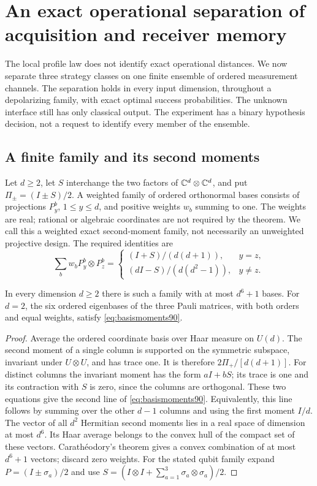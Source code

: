 \section{An exact operational separation of acquisition and receiver memory}
\label{sec:operationalmemory90}
The local profile law does not identify exact operational distances.
We now separate three strategy classes on one finite ensemble of ordered
measurement channels.  The separation holds in every input dimension,
throughout a depolarizing family, with exact optimal success probabilities.
The unknown interface still has only classical output.  The experiment
has a binary hypothesis decision, not a request to identify every member
of the ensemble.

\subsection{A finite family and its second moments}
Let $d\ge2$, let $S$ interchange the two factors of $\mathbb C^d\otimes\mathbb C^d$,
and put $\Pi_\pm=(I\pm S)/2$.  A weighted family of ordered orthonormal
bases consists of projections $P_y^b$, $1\le y\le d$, and positive
weights $w_b$ summing to one.  The weights are real; rational or algebraic coordinates are not required
by the theorem.  We call this a weighted exact second-moment family,
not necessarily an unweighted projective design.  The required identities are
\begin{equation}\label{eq:basismoments90}
 \sum_b w_b P_y^b\otimes P_z^b=
 \begin{cases}
 (I+S)/(d(d+1)),&y=z,\\
 (dI-S)/(d(d^2-1)),&y\ne z.
 \end{cases}
\end{equation}
\begin{lemma}\label{lem:finitedesign90}
In every dimension $d\ge2$ there is such a family with at most $d^6+1$
bases.  For $d=2$, the six ordered eigenbases of the three Pauli matrices,
with both orders and equal weights, satisfy \eqref{eq:basismoments90}.
\end{lemma}
\begin{proof}
Average the ordered coordinate basis over Haar measure on $U(d)$.
The second moment of a single column is supported on the symmetric
subspace, invariant under $U\otimes U$, and has trace one.  It is
therefore $2\Pi_+/[d(d+1)]$.  For distinct columns the invariant moment
has the form $aI+bS$; its trace is one and its contraction with $S$ is
zero, since the columns are orthogonal.  These two equations give the
second line of \eqref{eq:basismoments90}.  Equivalently, this line follows
by summing over the other $d-1$ columns and using the first moment $I/d$.
The vector of all $d^2$ Hermitian second moments lies in a real space of
dimension at most $d^6$.  Its Haar average belongs to the convex hull
of the compact set of these vectors.  Carath\'eodory's theorem gives a
convex combination of at most $d^6+1$ vectors; discard zero weights.
For the stated qubit family expand $P=(I\pm\sigma_a)/2$ and use
$S=(I\otimes I+\sum_{a=1}^3\sigma_a\otimes\sigma_a)/2$.
\end{proof}
